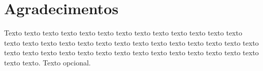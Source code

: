 \chapter*{Agradecimentos}

Texto texto texto texto texto texto texto texto texto texto texto texto texto
texto texto texto texto texto texto texto texto texto texto texto texto texto
texto texto texto texto texto texto texto texto texto texto texto texto texto
texto texto texto texto. Texto opcional.





\makeatletter
\if@openright\cleardoublepage\else\clearpage\fi
\makeatother


\newcommand\disablenewpage[1]{{\let\clearpage\par\let\cleardoublepage\par #1}}

